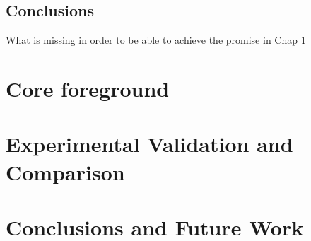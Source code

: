 \documentclass[12pt,a4paper]{report}
\begin{document}
	\begin{table}[h]
		\centering	
		
	\end{table} 
		
	\section{Conclusions}
	\label{sec:bg:concl}
	
	What is missing in order to be able to achieve the promise in Chap 1
	
	
	\chapter{Core foreground}
	\label{sec:fg}
	
	\chapter{Experimental Validation and Comparison}
	\label{sec:exp}
	
	\chapter{Conclusions and Future Work}
	\label{sec:concl}
	
	\renewcommand{\bibname}{References}
	
	
\end{document}

